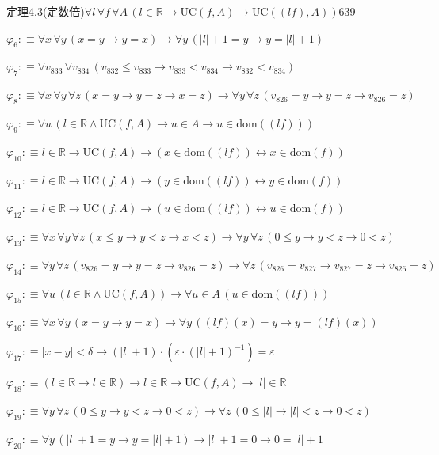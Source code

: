 \begin{fullproof}{定理4.3(定数倍)}{$\forall l\,\forall f\,\forall A\,(l \in \mathbb{R} \to \mathrm{UC}(f,A) \to \mathrm{UC}((l f),A))$}{639}
\begin{abbrevlist}
\item $\varphi_{6} :\equiv \forall x\,\forall y\,(x = y \to y = x) \to \forall y\,(\lvert l \rvert + 1 = y \to y = \lvert l \rvert + 1)$
\item $\varphi_{7} :\equiv \forall v_{833}\,\forall v_{834}\,(v_{832} \leq v_{833} \to v_{833} < v_{834} \to v_{832} < v_{834})$
\item $\varphi_{8} :\equiv \forall x\,\forall y\,\forall z\,(x = y \to y = z \to x = z) \to \forall y\,\forall z\,(v_{826} = y \to y = z \to v_{826} = z)$
\item $\varphi_{9} :\equiv \forall u\,(l \in \mathbb{R} \land \mathrm{UC}(f,A) \to u \in A \to u \in \mathrm{dom}((l f)))$
\item $\varphi_{10} :\equiv l \in \mathbb{R} \to \mathrm{UC}(f,A) \to (x \in \mathrm{dom}((l f)) \leftrightarrow x \in \mathrm{dom}(f))$
\item $\varphi_{11} :\equiv l \in \mathbb{R} \to \mathrm{UC}(f,A) \to (y \in \mathrm{dom}((l f)) \leftrightarrow y \in \mathrm{dom}(f))$
\item $\varphi_{12} :\equiv l \in \mathbb{R} \to \mathrm{UC}(f,A) \to (u \in \mathrm{dom}((l f)) \leftrightarrow u \in \mathrm{dom}(f))$
\item $\varphi_{13} :\equiv \forall x\,\forall y\,\forall z\,(x \leq y \to y < z \to x < z) \to \forall y\,\forall z\,(0 \leq y \to y < z \to 0 < z)$
\item $\varphi_{14} :\equiv \forall y\,\forall z\,(v_{826} = y \to y = z \to v_{826} = z) \to \forall z\,(v_{826} = v_{827} \to v_{827} = z \to v_{826} = z)$
\item $\varphi_{15} :\equiv \forall u\,(l \in \mathbb{R} \land \mathrm{UC}(f,A)) \to \forall u \in A\,(u \in \mathrm{dom}((l f)))$
\item $\varphi_{16} :\equiv \forall x\,\forall y\,(x = y \to y = x) \to \forall y\,((l f)(x) = y \to y = (l f)(x))$
\item $\varphi_{17} :\equiv \lvert x - y \rvert < \delta \to (\lvert l \rvert + 1) \cdot (\varepsilon \cdot (\lvert l \rvert + 1)^{-1}) = \varepsilon$
\item $\varphi_{18} :\equiv (l \in \mathbb{R} \to l \in \mathbb{R}) \to l \in \mathbb{R} \to \mathrm{UC}(f,A) \to \lvert l \rvert \in \mathbb{R}$
\item $\varphi_{19} :\equiv \forall y\,\forall z\,(0 \leq y \to y < z \to 0 < z) \to \forall z\,(0 \leq \lvert l \rvert \to \lvert l \rvert < z \to 0 < z)$
\item $\varphi_{20} :\equiv \forall y\,(\lvert l \rvert + 1 = y \to y = \lvert l \rvert + 1) \to \lvert l \rvert + 1 = 0 \to 0 = \lvert l \rvert + 1$

\end{abbrevlist}
\end{fullproof}
